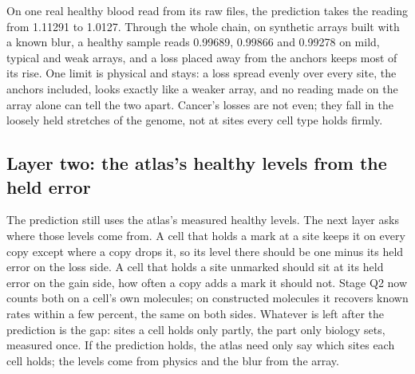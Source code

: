 On one real healthy blood read from its raw files, the prediction takes the reading from 1.11291 to 1.0127. Through the whole chain, on
synthetic arrays built with a known blur, a healthy sample reads 0.99689, 0.99866 and 0.99278 on mild, typical and weak arrays, and a loss
placed away from the anchors keeps most of its rise. One limit is physical and stays: a loss spread evenly over every site, the anchors
included, looks exactly like a weaker array, and no reading made on the array alone can tell the two apart. Cancer's losses are not even;
they fall in the loosely held stretches of the genome, not at sites every cell type holds firmly.

\subsection{Layer two: the atlas's healthy levels from the held error}

The prediction still uses the atlas's measured healthy levels. The next layer asks where those levels come from. A cell that holds a mark
at a site keeps it on every copy except where a copy drops it, so its level there should be one minus its held error on the loss side. A
cell that holds a site unmarked should sit at its held error on the gain side, how often a copy adds a mark it should not. Stage Q2 now
counts both on a cell's own molecules; on constructed molecules it recovers known rates within a few percent, the same on both sides.
Whatever is left after the prediction is the gap: sites a cell holds only partly, the part only biology sets, measured once. If the
prediction holds, the atlas need only say which sites each cell holds; the levels come from physics and the blur from the array.
